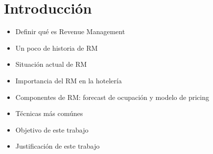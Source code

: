 \chapter{Introducción}
\label{ch:intro}

\begin{itemize}
  \item Definir qué es Revenue Management
  \item Un poco de historia de RM
  \item Situación actual de RM
  \item Importancia del RM en la hotelería
  \item Componentes de RM: forecast de ocupación y modelo de pricing
  \item Técnicas más comúnes
  \item Objetivo de este trabajo
  \item Justificación de este trabajo
\end{itemize}

